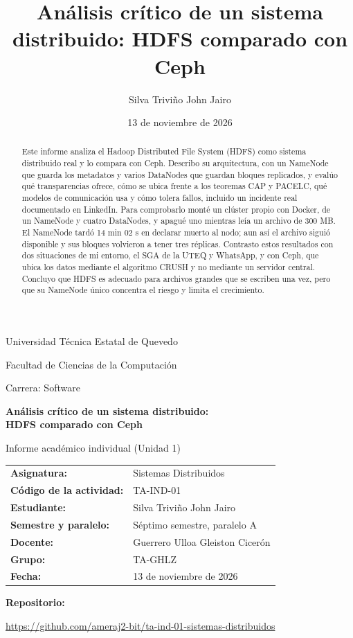 \documentclass[11pt,a4paper]{article}
\title{Análisis crítico de un sistema distribuido: HDFS comparado con Ceph}
\author{Silva Triviño John Jairo}
\date{13 de noviembre de 2026}
\begin{document}
\begin{titlepage}
\centering
{\large Universidad Técnica Estatal de Quevedo\par}
\vspace{0.4cm}
{\large Facultad de Ciencias de la Computación\par}
\vspace{0.4cm}
{\large Carrera: Software\par}
\vspace{1.5cm}
{\LARGE\bfseries Análisis crítico de un sistema distribuido:\\ HDFS comparado con Ceph\par}
\vspace{1.5cm}
{\large Informe académico individual (Unidad 1)\par}
\vspace{1.5cm}
\begin{tabular}{@{}ll@{}}
\textbf{Asignatura:} & Sistemas Distribuidos\\[4pt]
\textbf{Código de la actividad:} & TA-IND-01\\[4pt]
\textbf{Estudiante:} & Silva Triviño John Jairo\\[4pt]
\textbf{Semestre y paralelo:} & Séptimo semestre, paralelo A\\[4pt]
\textbf{Docente:} & Guerrero Ulloa Gleiston Cicerón\\[4pt]
\textbf{Grupo:} & TA-GHLZ\\[4pt]
\textbf{Fecha:} & 13 de noviembre de 2026
\end{tabular}\par
\vspace{0.8cm}
\textbf{Repositorio:}\par\smallskip
{\small\url{https://github.com/ameraj2-bit/ta-ind-01-sistemas-distribuidos}\par}
\vfill
\end{titlepage}

\begin{abstract}
Este informe analiza el Hadoop Distributed File System (HDFS) como sistema distribuido real y lo compara con Ceph. Describo su arquitectura, con un NameNode que guarda los metadatos y varios DataNodes que guardan bloques replicados, y evalúo qué transparencias ofrece, cómo se ubica frente a los teoremas CAP y PACELC, qué modelos de comunicación usa y cómo tolera fallos, incluido un incidente real documentado en LinkedIn. Para comprobarlo monté un clúster propio con Docker, de un NameNode y cuatro DataNodes, y apagué uno mientras leía un archivo de 300 MB. El NameNode tardó 14 min 02 s en declarar muerto al nodo; aun así el archivo siguió disponible y sus bloques volvieron a tener tres réplicas. Contrasto estos resultados con dos situaciones de mi entorno, el SGA de la UTEQ y WhatsApp, y con Ceph, que ubica los datos mediante el algoritmo CRUSH y no mediante un servidor central. Concluyo que HDFS es adecuado para archivos grandes que se escriben una vez, pero que su NameNode único concentra el riesgo y limita el crecimiento.
\end{abstract}
\end{document}
